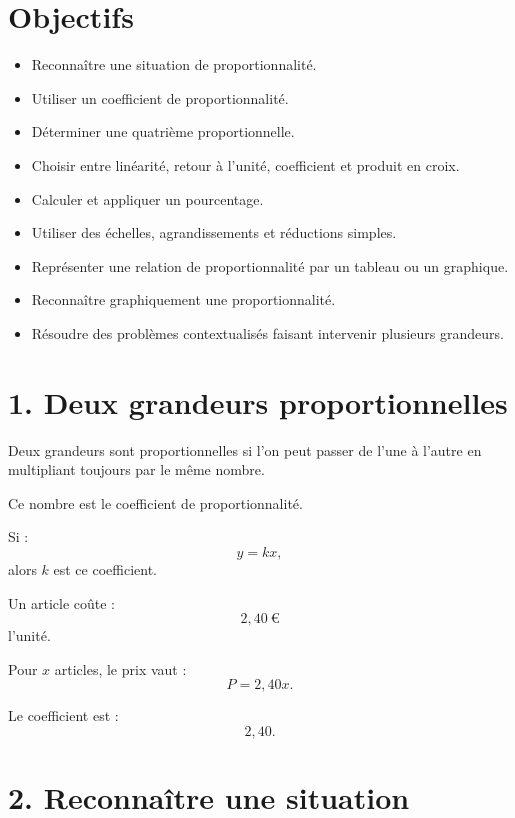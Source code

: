 
\section{Objectifs}

\begin{itemize}
\item Reconnaître une situation de proportionnalité.
\item Utiliser un coefficient de proportionnalité.
\item Déterminer une quatrième proportionnelle.
\item Choisir entre linéarité, retour à l'unité, coefficient et produit en croix.
\item Calculer et appliquer un pourcentage.
\item Utiliser des échelles, agrandissements et réductions simples.
\item Représenter une relation de proportionnalité par un tableau ou un graphique.
\item Reconnaître graphiquement une proportionnalité.
\item Résoudre des problèmes contextualisés faisant intervenir plusieurs grandeurs.
\end{itemize}

\section{1. Deux grandeurs proportionnelles}

Deux grandeurs sont proportionnelles si l'on peut passer de l'une à l'autre en multipliant toujours par le même nombre.

Ce nombre est le coefficient de proportionnalité.

Si :
\[
y=kx,
\]
alors $k$ est ce coefficient.

\begin{exemple}
Un article coûte :
\[
2{,}40\ \text{€}
\]
l'unité.

Pour $x$ articles, le prix vaut :
\[
P=2{,}40x.
\]

Le coefficient est :
\[
2{,}40.
\]
\end{exemple}

\section{2. Reconnaître une situation}

